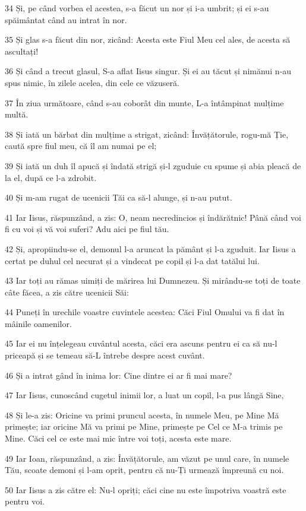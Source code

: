 \par 34 Și, pe când vorbea el acestea, s-a făcut un nor și i-a umbrit; și ei s-au spăimântat când au intrat în nor.
\par 35 Și glas s-a făcut din nor, zicând: Acesta este Fiul Meu cel ales, de acesta să ascultați!
\par 36 Și când a trecut glasul, S-a aflat Iisus singur. Și ei au tăcut și nimănui n-au spus nimic, în zilele acelea, din cele ce văzuseră.
\par 37 În ziua următoare, când s-au coborât din munte, L-a întâmpinat mulțime multă.
\par 38 Și iată un bărbat din mulțime a strigat, zicând: Învățătorule, rogu-mă Ție, caută spre fiul meu, că îl am numai pe el;
\par 39 Și iată un duh îl apucă și îndată strigă și-l zguduie cu spume și abia pleacă de la el, după ce l-a zdrobit.
\par 40 Și m-am rugat de ucenicii Tăi ca să-l alunge, și n-au putut.
\par 41 Iar Iisus, răspunzând, a zis: O, neam necredincios și îndărătnic! Până când voi fi cu voi și vă voi suferi? Adu aici pe fiul tău.
\par 42 Și, apropiindu-se el, demonul l-a aruncat la pământ și l-a zguduit. Iar Iisus a certat pe duhul cel necurat și a vindecat pe copil și l-a dat tatălui lui.
\par 43 Iar toți au rămas uimiți de mărirea lui Dumnezeu. Și mirându-se toți de toate câte făcea, a zis către ucenicii Săi:
\par 44 Puneți în urechile voastre cuvintele acestea: Căci Fiul Omului va fi dat în mâinile oamenilor.
\par 45 Iar ei nu înțelegeau cuvântul acesta, căci era ascuns pentru ei ca să nu-l priceapă și se temeau să-L întrebe despre acest cuvânt.
\par 46 Și a intrat gând în inima lor: Cine dintre ei ar fi mai mare?
\par 47 Iar Iisus, cunoscând cugetul inimii lor, a luat un copil, l-a pus lângă Sine,
\par 48 Și le-a zis: Oricine va primi pruncul acesta, în numele Meu, pe Mine Mă primește; iar oricine Mă va primi pe Mine, primește pe Cel ce M-a trimis pe Mine. Căci cel ce este mai mic între voi toți, acesta este mare.
\par 49 Iar Ioan, răspunzând, a zis: Învățătorule, am văzut pe unul care, în numele Tău, scoate demoni și l-am oprit, pentru că nu-Ți urmează împreună cu noi.
\par 50 Iar Iisus a zis către el: Nu-l opriți; căci cine nu este împotriva voastră este pentru voi.
